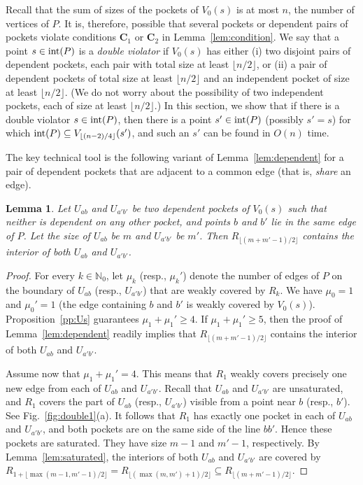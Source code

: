 \documentclass[12pt]{article}
\newcommand{\floor}[1]{{\lfloor #1 \rfloor}}
\newtheorem{lemma}{Lemma}
\begin{document}
Recall that the sum of sizes of the pockets of $V_0(s)$ is at most $n$, the number of vertices of $P$.
It is, therefore, possible that several pockets or dependent pairs of pockets violate
conditions $\mathbf{C}_1$ or $\mathbf{C}_2$ in Lemma~\ref{lem:condition}.
We say that a point $s\in {\rm int}(P)$ is a
\emph{double violator} if $V_0(s)$ has either (i) two disjoint pairs of dependent pockets, each
pair with total size at least $\floor{n/2}$, or (ii) a pair of dependent pockets of total size at
least $\floor{n/2}$ and an independent pocket of size at least $\floor{n/2}$. (We do not worry
about the possibility of two independent pockets, each of size at least $\floor{n/2}$.)
In this section, we show that if there is a double violator
$s\in {\rm int}(P)$, then there is a point $s'\in {\rm int}(P)$ (possibly $s'=s$) for which
${\rm int}(P)\subseteq V_{\floor{(n-2)/4}}(s')$, and such an $s'$ can be found in $O(n)$ time.

The key technical tool is the following variant of Lemma~\ref{lem:dependent} for
a pair of dependent pockets that are adjacent to a common edge (that is, \emph{share} an edge).

\begin{lemma}\label{lem:double}
Let $U_{ab}$ and $U_{a'b'}$ be two dependent pockets of $V_0(s)$ such that neither is dependent on any other pocket, and points $b$ and $b'$ lie in the same edge of $P$. Let the size of $U_{ab}$ be $m$ and $U_{a'b'}$ be $m'$.
Then $R_{\floor{(m+m'-1)/2}}$ contains the interior of both $U_{ab}$ and $U_{a'b'}$.
\end{lemma}

\begin{proof}
For every $k\in \mathbb{N}_0$, let $\mu_k$ (resp., $\mu_k'$) denote the number of edges of $P$ on the boundary of $U_{ab}$ (resp., $U_{a'b'}$) that are weakly covered by $R_k$. We have $\mu_0=1$ and $\mu_0'=1$ (the edge containing $b$ and $b'$ is weakly covered by $V_0(s)$). Proposition~\ref{pp:Us} guarantees $\mu_1+\mu_1'\geq 4$. If $\mu_1+\mu_1'\geq 5$, then the proof of Lemma~\ref{lem:dependent} readily implies that $R_{\floor{(m+m'-1)/2}}$ contains the interior of both $U_{ab}$ and $U_{a'b'}$.

Assume now that $\mu_1+\mu_1'=4$. This means that $R_1$ weakly covers precisely one new edge from each of $U_{ab}$ and $U_{a'b'}$. Recall that $U_{ab}$ and $U_{a'b'}$ are unsaturated, and $R_1$ covers the part of $U_{ab}$ (resp., $U_{a'b'}$) visible from a point near $b$ (resp., $b'$). See Fig.~\ref{fig:double1}(a). It follows that $R_1$
has exactly one pocket in each of $U_{ab}$ and $U_{a'b'}$, and both pockets are on the same
side of the line $bb'$. Hence these pockets are saturated. They have size $m-1$ and $m'-1$, respectively.
By Lemma~\ref{lem:saturated}, the interiors of both $U_{ab}$ and $U_{a'b'}$ are covered by $R_{1+\floor{\max(m-1,m'-1)/2}}= R_{\floor{(\max(m,m')+1)/2}}\subseteq R_{\floor{(m+m'-1)/2}}$.
\end{proof}
\end{document}
